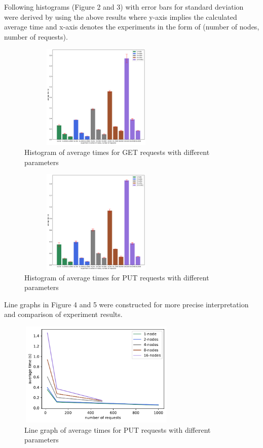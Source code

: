 \documentclass[
    a4paper,
    twocolumn,
]{article}
\begin{document}
Following histograms (Figure 2 and 3) with error bars for standard deviation~\cite{2} were derived by using the above results where y-axis implies the calculated average time and x-axis denotes the experiments in the form of (number of nodes, number of requests).\\

\setlength{\intextsep}{10pt plus 2pt minus 0pt}
\begin{figure}[!ht]
	\centering
	\includegraphics[width=7.5cm, height=5cm]{get.pdf}
	\caption{Histogram of average times for GET requests with different parameters}
\end{figure}

\setlength{\intextsep}{5pt plus 2pt minus 0pt}
\begin{figure}[!ht]
	\centering
	\includegraphics[width=7.5cm, height=5cm]{put.pdf}
	\caption{Histogram of average times for PUT requests with different parameters}
\end{figure}

Line graphs in Figure 4 and 5 were constructed for more precise interpretation and comparison of experiment results.\\

\setlength{\intextsep}{7pt plus 2pt minus 0pt}
\begin{figure}[!ht]
	\centering
	\includegraphics[width=7.5cm, height=5cm]{put_line.pdf}
	\caption{Line graph of average times for PUT requests with different parameters}
\end{figure}
\end{document}

